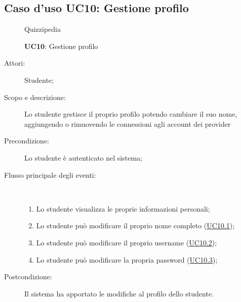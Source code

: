 \subsection{Caso d'uso UC10: Gestione profilo}
\begin{figure}[H]
	\centering
	\begin{resizedtikzpicture}{\textwidth}
		\begin{umlsystem}[x=0, fill=lightgray!20]{Quizzipedia}
		\end{umlsystem}
	\end{resizedtikzpicture}
	\caption{\textbf{UC10}: Gestione profilo}
	\label{UC10}
\end{figure}
\begin{description}
	\item[Attori:] Studente;
	\item[Scopo e descrizione:] Lo studente gestisce il proprio profilo potendo cambiare il suo nome, aggiungendo o rimuovendo le connessioni agli account dei provider 
	\item[Precondizione:] Lo studente è autenticato nel sistema;
	
	\item[Flusso principale degli eventi:] \ 
	\begin{enumerate}
		\item Lo studente visualizza le proprie informazioni personali;
		\item Lo studente può modificare il proprio nome completo (\hyperlink{UC10.1}{UC10.1});
		\item Lo studente può modificare il proprio username	 (\hyperlink{UC10.2}{UC10.2});
		\item Lo studente può modificare la propria password (\hyperlink{UC10.3}{UC10.3});
		
	\end{enumerate}
	\item[Postcondizione:] Il sistema ha apportato le modifiche al profilo dello studente.
\end{description}
\hypertarget{UC10.1}{}
